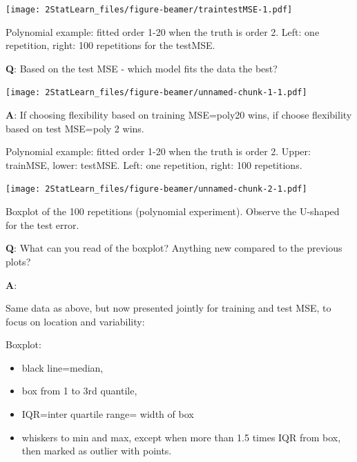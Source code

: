 \documentclass[ignorenonframetext,]{beamer}
\providecommand{\tightlist}{%
  \setlength{\itemsep}{0pt}\setlength{\parskip}{0pt}}
\begin{document}
\begin{frame}

\texttt{[image: 2StatLearn\_files/figure-beamer/traintestMSE-1.pdf]}

Polynomial example: fitted order 1-20 when the truth is order 2. Left:
one repetition, right: 100 repetitions for the testMSE.

\textbf{Q}: Based on the test MSE - which model fits the data the best?

\end{frame}

\begin{frame}

\texttt{[image: 2StatLearn\_files/figure-beamer/unnamed-chunk-1-1.pdf]}

\textbf{A}: If choosing flexibility based on training MSE=poly20 wins,
if choose flexibility based on test MSE=poly 2 wins.

Polynomial example: fitted order 1-20 when the truth is order 2. Upper:
trainMSE, lower: testMSE. Left: one repetition, right: 100 repetitions.

\end{frame}

\begin{frame}

\texttt{[image: 2StatLearn\_files/figure-beamer/unnamed-chunk-2-1.pdf]}

Boxplot of the 100 repetitions (polynomial experiment). Observe the
U-shaped for the test error.

\textbf{Q}: What can you read of the boxplot? Anything new compared to
the previous plots?

\end{frame}

\begin{frame}

\textbf{A}:

Same data as above, but now presented jointly for training and test MSE,
to focus on location and variability:

Boxplot:

\begin{itemize}
\tightlist
\item
  black line=median,
\item
  box from 1 to 3rd quantile,
\item
  IQR=inter quartile range= width of box
\item
  whiskers to min and max, except when more than 1.5 times IQR from box,
  then marked as outlier with points.
\end{itemize}

\end{frame}
\end{document}
